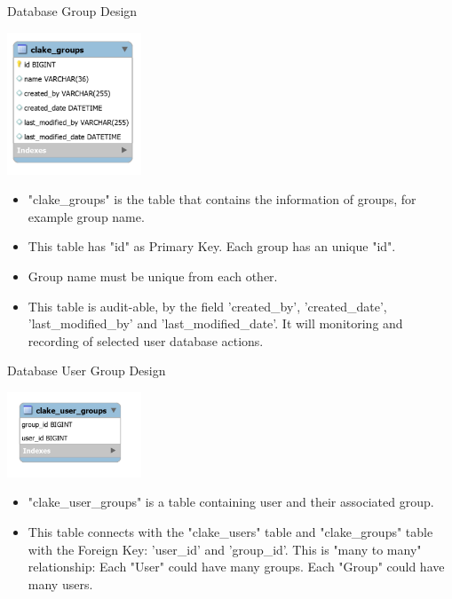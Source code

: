 \begin{table}[H]
  \centering
  \caption{Database Group Design}
  \label{tbl:dbGroup}
  \includegraphics[width=0.3\textwidth]{images/DatabaseUserGroupDesign.PNG}
\end{table}
\begin{itemize}
    \item "clake\_groups" is the table that contains the information of groups, for example group name. 
    \item This table has "id" as Primary Key. Each group has an unique "id". 
    \item Group name must be unique from each other.
    \item This table is audit-able, by the field 'created\_by', 'created\_date', 'last\_modified\_by' and 'last\_modified\_date'. It will monitoring and recording of selected user database actions.
\end{itemize}

\begin{table}[H]
  \centering
  \caption{Database User Group Design}
  \label{tbl:dbUserGroup}
  \includegraphics[width=0.3\textwidth]{images/DatabaseUserAGroupDesign.PNG}
\end{table}
\begin{itemize}
    \item "clake\_user\_groups" is a table containing user and their associated group.
    \item This table connects with the "clake\_users" table and "clake\_groups" table with the Foreign Key: 'user\_id' and 'group\_id'. This is "many to many" relationship: Each "User" could have many groups. Each "Group" could have many users.  
\end{itemize}

